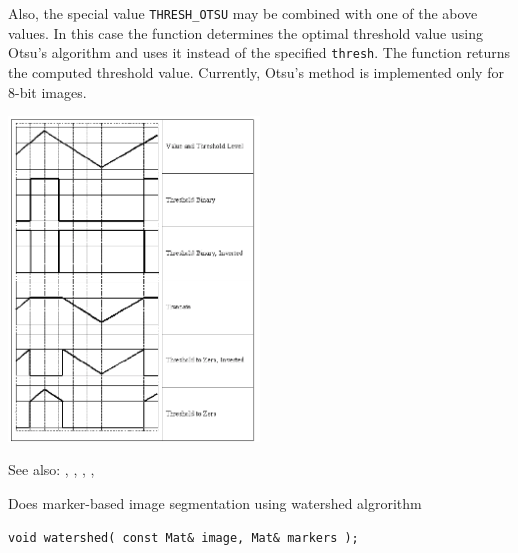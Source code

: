 \begin{description}
\end{description}

Also, the special value \texttt{THRESH\_OTSU} may be combined with
one of the above values. In this case the function determines the optimal threshold
value using Otsu's algorithm and uses it instead of the specified \texttt{thresh}.
The function returns the computed threshold value.
Currently, Otsu's method is implemented only for 8-bit images.

\includegraphics[width=0.5\textwidth]{pics/threshold.png}

See also: , , , , 

\label{watershed}
Does marker-based image segmentation using watershed algrorithm

\begin{lstlisting}
void watershed( const Mat& image, Mat& markers );
\end{lstlisting}
\begin{description}
\end{description}

